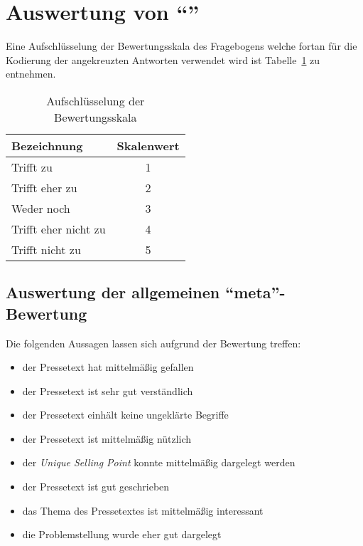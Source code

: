 


 





\section{Auswertung von \enquote{\varpressetext}}

Eine Aufschlüsselung der Bewertungsskala des Fragebogens welche fortan für die
Kodierung der angekreuzten Antworten verwendet wird ist
Tabelle~\ref{tab:skala} zu entnehmen.

\begin{table}[!ht]
    \caption{Aufschlüsselung der Bewertungsskala}
    \label{tab:skala}
    \begin{center}
        \begin{tabular}{lc}
        \toprule
        \textbf{Bezeichnung} & \textbf{Skalenwert} \\
        \midrule
        Trifft zu & 1 \\
        Trifft eher zu & 2 \\
        Weder noch & 3 \\
        Trifft eher nicht zu & 4 \\
        Trifft nicht zu & 5 \\
        \bottomrule
        \end{tabular}
    \end{center}
\end{table}

\subsection{Auswertung der allgemeinen \enquote{meta}-Bewertung}

Die folgenden Aussagen lassen sich aufgrund der Bewertung treffen:

\begin{itemize}
    \item der Pressetext hat mittelmäßig gefallen
    \item der Pressetext ist sehr gut verständlich
    \item der Pressetext einhält keine ungeklärte Begriffe
    \item der Pressetext ist mittelmäßig nützlich
    \item der \emph{Unique Selling Point} konnte mittelmäßig dargelegt werden
    \item der Pressetext ist gut geschrieben
    \item das Thema des Pressetextes ist mittelmäßig interessant
    \item die Problemstellung wurde eher gut dargelegt
\end{itemize}

